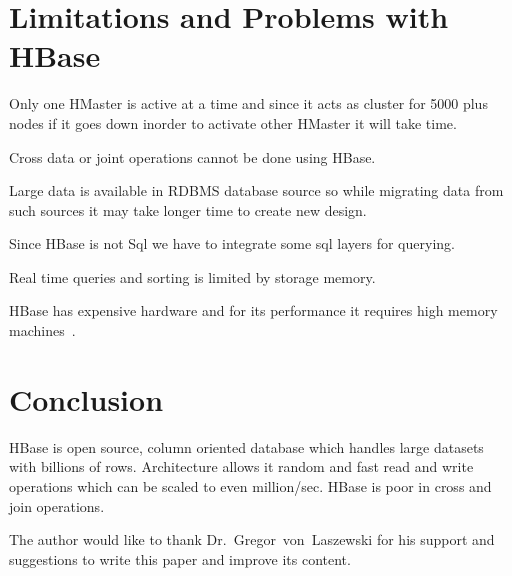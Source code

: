 \section{Limitations and Problems with HBase}
\begin{description}
  \item Only one HMaster is active at a time and since it acts as cluster for 5000 plus 
nodes if it goes down inorder to activate other HMaster it will take time.
 \item Cross data or joint operations cannot be done using HBase.
 \item Large data is available in RDBMS database source so while migrating data
 from such sources it may take longer time to create new design.
 \item Since HBase is not Sql we have to integrate some sql layers for querying.
 \item Real time queries and sorting is limited by storage memory.
 \item HBase has expensive hardware and for its performance it requires high 
 memory machines~\cite{hid-sp18-421-HBase-limitations}.
\end{description}

\section{Conclusion}
HBase is open source, column oriented database which handles large datasets with
billions of rows. Architecture allows it random and fast read and write operations
which can be scaled to even million/sec. HBase is poor in cross and join operations. 

\begin{acks}

The author would like to thank Dr.~Gregor~von~Laszewski for his support and
suggestions to write this paper and improve its content.

\end{acks}



 


